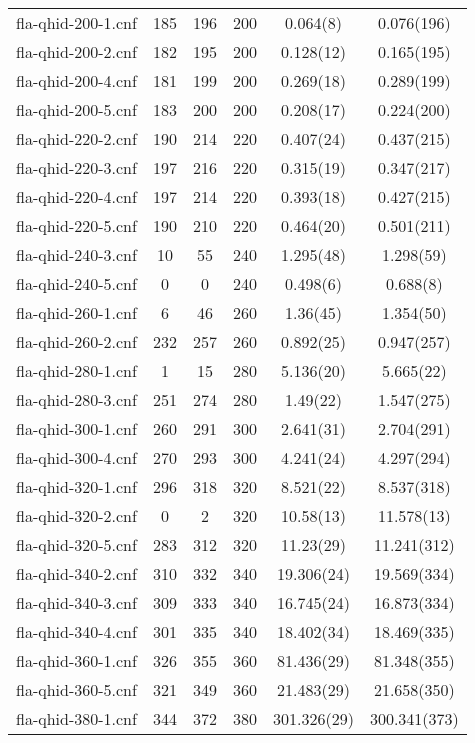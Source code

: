 \begin{table}
\begin{tabular}{l| c c c c c }
fla-qhid-200-1.cnf & 185 & 196 & 200 & 0.064(8) & 0.076(196) \\
fla-qhid-200-2.cnf & 182 & 195 & 200 & 0.128(12) & 0.165(195) \\
fla-qhid-200-4.cnf & 181 & 199 & 200 & 0.269(18) & 0.289(199) \\
fla-qhid-200-5.cnf & 183 & 200 & 200 & 0.208(17) & 0.224(200) \\
fla-qhid-220-2.cnf & 190 & 214 & 220 & 0.407(24) & 0.437(215) \\
fla-qhid-220-3.cnf & 197 & 216 & 220 & 0.315(19) & 0.347(217) \\
fla-qhid-220-4.cnf & 197 & 214 & 220 & 0.393(18) & 0.427(215) \\
fla-qhid-220-5.cnf & 190 & 210 & 220 & 0.464(20) & 0.501(211) \\
fla-qhid-240-3.cnf & 10 & 55 & 240 & 1.295(48) & 1.298(59) \\
fla-qhid-240-5.cnf & 0 & 0 & 240 & 0.498(6) & 0.688(8) \\
fla-qhid-260-1.cnf & 6 & 46 & 260 & 1.36(45) & 1.354(50) \\
fla-qhid-260-2.cnf & 232 & 257 & 260 & 0.892(25) & 0.947(257) \\
fla-qhid-280-1.cnf & 1 & 15 & 280 & 5.136(20) & 5.665(22) \\
fla-qhid-280-3.cnf & 251 & 274 & 280 & 1.49(22) & 1.547(275) \\
fla-qhid-300-1.cnf & 260 & 291 & 300 & 2.641(31) & 2.704(291) \\
fla-qhid-300-4.cnf & 270 & 293 & 300 & 4.241(24) & 4.297(294) \\
fla-qhid-320-1.cnf & 296 & 318 & 320 & 8.521(22) & 8.537(318) \\
fla-qhid-320-2.cnf & 0 & 2 & 320 & 10.58(13) & 11.578(13) \\
fla-qhid-320-5.cnf & 283 & 312 & 320 & 11.23(29) & 11.241(312) \\
fla-qhid-340-2.cnf & 310 & 332 & 340 & 19.306(24) & 19.569(334) \\
fla-qhid-340-3.cnf & 309 & 333 & 340 & 16.745(24) & 16.873(334) \\
fla-qhid-340-4.cnf & 301 & 335 & 340 & 18.402(34) & 18.469(335) \\
fla-qhid-360-1.cnf & 326 & 355 & 360 & 81.436(29) & 81.348(355) \\
fla-qhid-360-5.cnf & 321 & 349 & 360 & 21.483(29) & 21.658(350) \\
fla-qhid-380-1.cnf & 344 & 372 & 380 & 301.326(29) & 300.341(373) \\

\end{tabular}
\end{table}
